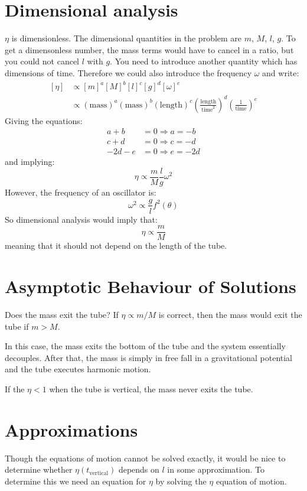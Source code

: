\documentclass[9pt]{report}
\begin{document}
\begin{enumerate}
\section{Dimensional analysis}
$\eta$ is dimensionless. The dimensional quantities in the problem are $m$,
$M$, $l$, $g$. To get a dimensonless number, the mass terms would have
to cancel in a ratio, but you could not cancel $l$ with $g$. You need to introduce
another quantity which has dimensions of time. Therefore we could also introduce
the frequency $\omega$ and write:
\[
  \begin{align}
    [\eta] &\propto [m]^a [M]^b [l]^c [g]^d [\omega]^e \\
           &\propto (\text{mass})^a (\text{mass})^b (\text{length})^c (\frac{\text{length}}{\text{time}^2})^d (\frac{1}{\text{time}})^e
  \end{align}
\]
Giving the equations:
\[
  \begin{align}
    a + b &= 0 \Rightarrow a = -b\\
    c + d &= 0 \Rightarrow c = -d\\
    -2d-e &= 0 \Rightarrow e = -2d
  \end{align}
\]
and implying:
\[
  \eta \propto \frac{m}{M}\frac{l}{g}\omega^2
\]
However, the frequency of an oscillator is:
\[
  \omega^2 \propto \frac{g}{l} f^2(\theta)
\]
So dimensional analysis would imply that:
\[
  \eta \propto \frac{m}{M}
\]
meaning that it should not depend on the length of the tube.

\section{Asymptotic Behaviour of Solutions}
Does the mass exit the tube? If $\eta \propto m / M$ is correct, then the mass
would exit the tube if $m > M$.

In this case, the mass exits the bottom of the tube and the system
essentially decouples. After that, the mass is simply in free fall in a
gravitational potential and the tube executes harmonic motion.

If the $\eta < 1$ when the tube is vertical, the mass never exits the tube.

\section{Approximations}
Though the equations of motion cannot be solved exactly, it would be nice to
determine whether $\eta(t_\text{vertical})$ depends on $l$ in some approximation.
To determine this we need an equation for $\eta$ by solving the $\eta$ equation
of motion.



\end{enumerate}
\end{document}
